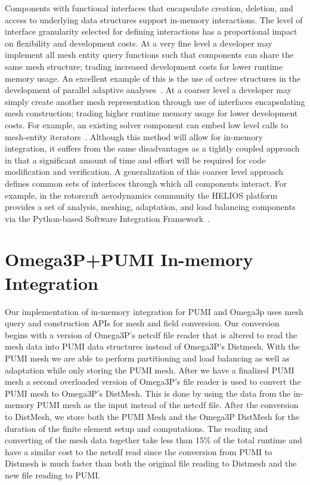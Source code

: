 \documentclass[a4paper]{article}
\begin{document}
Components with functional interfaces that encapsulate creation, deletion, and
access to underlying data structures support in-memory interactions.
The level of interface granularity selected for defining interactions has a
proportional impact on flexibility and development costs.
At a very fine level a developer may implement all mesh entity query functions such
that components can share the same mesh structure; trading increased development
costs for lower runtime memory usage.
An excellent example of this is the use of octree structures in the
development of parallel adaptive analyses~\cite{BursteddeWilcoxGhattas11}.
At a coarser level a developer may simply create another mesh
representation through use of interfaces encapsulating mesh construction;
trading higher runtime memory usage for lower development costs.
For example, an existing solver component can embed low level
calls to mesh-entity iterators~\cite{Ollivier10}.
Although this method will allow for in-memory integration, it suffers from the
same disadvantages as a tightly coupled approach in that a significant amount of
time and effort will be required for code modification and verification.
A generalization of this coarser level approach defines common sets of
interfaces through which all components interact.
For example, in the rotorcraft aerodynamics community the HELIOS platform
provides a set of analysis, meshing, adaptation, and load balancing components
via the Python-based Software Integration Framework~\cite{sankaran2010application}.

\section{Omega3P+PUMI In-memory Integration}\label{sec:omega-pumi}

Our implementation of in-memory integration for PUMI and Omega3p uses
mesh query and construction APIs for mesh and field conversion.
Our conversion begins with a version of Omega3P's netcdf file reader that is altered 
to read the mesh data into PUMI data structures instead of Omega3P's Distmesh. With 
the PUMI mesh we are able to perform partitioning and load balancing as well as adaptation 
while only storing the PUMI mesh. After we have a finalized PUMI mesh a second 
overloaded version of Omega3P's file reader is used to convert the PUMI mesh to 
Omega3P's DistMesh. This is done by using the data from the in-memory PUMI mesh as the 
input instead of the netcdf file. After the conversion to DistMesh, we store both the 
PUMI Mesh and the Omega3P DistMesh for the duration of the finite element setup and 
computations. The reading and converting of the mesh data together take less than 15\% 
of the total runtime and have a similar cost to the netcdf read since the conversion 
from PUMI to Distmesh is much faster than both the original file reading to Distmesh 
and the new file reading to PUMI. 
\end{document}
